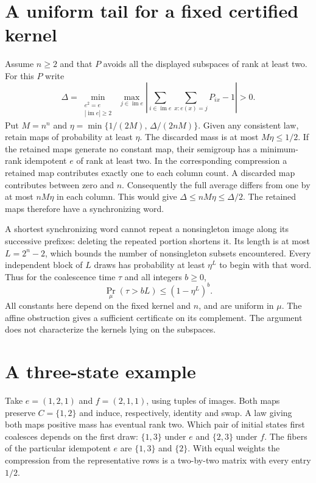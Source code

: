 \documentclass[11pt,a4paper]{amsart}
\begin{document}
\section{A uniform tail for a fixed certified kernel}
Assume $n\ge2$ and that $P$ avoids all the displayed subspaces of rank at least two. For this $P$ write
\[
 \Delta=\min_{\substack{e^2=e\\|\operatorname{im}e|\ge2}}
   \ \max_{j\in \operatorname{im}e}
       \left|\sum_{i\in \operatorname{im}e}\sum_{x:e(x)=j}P_{ix}-1\right|>0.
\]
Put $M=n^n$ and $\eta=\min\{1/(2M),\,\Delta/(2nM)\}$. Given any consistent law, retain maps of probability at least $\eta$. The discarded mass is at most $M\eta\le1/2$. If the retained maps generate no constant map, their semigroup has a minimum-rank idempotent $e$ of rank at least two. In the corresponding compression a retained map contributes exactly one to each column count. A discarded map contributes between zero and $n$. Consequently the full average differs from one by at most $nM\eta$ in each column. This would give $\Delta\le nM\eta\le\Delta/2$. The retained maps therefore have a synchronizing word.

A shortest synchronizing word cannot repeat a nonsingleton image along its successive prefixes: deleting the repeated portion shortens it. Its length is at most $L=2^n-2$, which bounds the number of nonsingleton subsets encountered. Every independent block of $L$ draws has probability at least $\eta^L$ to begin with that word. Thus for the coalescence time $\tau$ and all integers $b\ge0$,
\[
                 \Pr_{\mu}(\tau>bL)\le(1-\eta^L)^b.
\]
All constants here depend on the fixed kernel and $n$, and are uniform in $\mu$. The affine obstruction gives a sufficient certificate on its complement. The argument does not characterize the kernels lying on the subspaces.

\section{A three-state example}
Take $e=(1,2,1)$ and $f=(2,1,1)$, using tuples of images. Both maps preserve $C=\{1,2\}$ and induce, respectively, identity and swap. A law giving both maps positive mass has eventual rank two. Which pair of initial states first coalesces depends on the first draw: $\{1,3\}$ under $e$ and $\{2,3\}$ under $f$. The fibers of the particular idempotent $e$ are $\{1,3\}$ and $\{2\}$. With equal weights the compression from the representative rows is a two-by-two matrix with every entry $1/2$.
\end{document}
